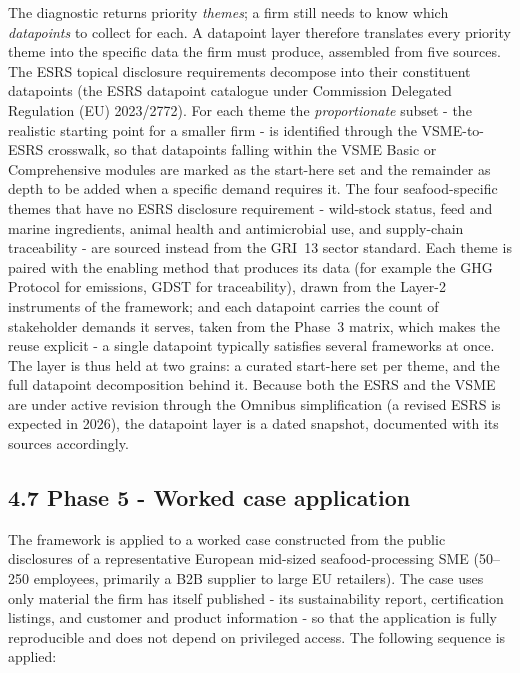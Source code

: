 \documentclass[
]{article}
\begin{document}
The diagnostic returns priority \emph{themes}; a firm still needs to know
which \emph{datapoints} to collect for each. A datapoint layer therefore
translates every priority theme into the specific data the firm must
produce, assembled from five sources. The ESRS topical disclosure
requirements decompose into their constituent datapoints (the ESRS datapoint
catalogue under Commission Delegated Regulation (EU) 2023/2772). For each
theme the \emph{proportionate} subset - the realistic starting point for a
smaller firm - is identified through the VSME-to-ESRS crosswalk, so that
datapoints falling within the VSME Basic or Comprehensive modules are marked
as the \textquotesingle start-here\textquotesingle{} set and the remainder as
depth to be added when a specific demand requires it. The four
seafood-specific themes that have no ESRS disclosure requirement - wild-stock status, feed and marine ingredients, animal health and
antimicrobial use, and supply-chain traceability - are sourced instead from
the GRI~13 sector standard. Each theme is paired with the enabling method that
produces its data (for example the GHG Protocol for emissions, GDST for
traceability), drawn from the Layer-2 instruments of the framework; and each
datapoint carries the count of stakeholder demands it serves, taken from the
Phase~3 matrix, which makes the reuse explicit - a single datapoint
typically satisfies several frameworks at once. The layer is thus held at two
grains: a curated start-here set per theme, and the full datapoint
decomposition behind it. Because both the ESRS and the VSME are under active
revision through the Omnibus simplification (a revised ESRS is expected in
2026), the datapoint layer is a dated snapshot, documented with its sources
accordingly.

\subsection{4.7 Phase 5 - Worked case
application}\label{phase-5---worked-case-application}

The framework is applied to a worked case constructed from the public
disclosures of a representative European mid-sized seafood-processing SME
(50--250 employees, primarily a B2B supplier to large EU retailers). The
case uses only material the firm has itself published - its
sustainability report, certification listings, and customer and product
information - so that the application is fully reproducible and does not
depend on privileged access. The following sequence is applied:
\end{document}
